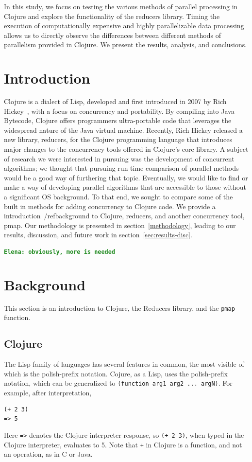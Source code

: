 \documentclass[12pt]{article}
\newcommand{\comment}[1]{{\bf \tt  {#1}}}
\newcommand{\emcomment}[1]{\textcolor{ForestGreen}{\comment{Elena: {#1}}}}
\newcommand{\clocode}[1]{{\texttt {#1}}}
\begin{document}
In this study, we focus on testing the various methods of parallel processing in Clojure and explore the functionality of the reducers library. Timing the execution of computationally expensive and highly parallelizable data processing allows us to directly observe the differences between different methods of parallelism provided in Clojure. We present the results, analysis, and conclusions.


 \newpage

\setcounter{page}{1}


\section{Introduction}\label{sec:intro}

	 Clojure is a dialect of Lisp, developed and first introduced in 2007 by Rich Hickey~\cite{Hickey:2008}, with a focus on concurrency and portability. By compiling into Java Bytecode, Clojure offers programmers ultra-portable code that leverages the widespread nature of the Java virtual machine. Recently, Rich Hickey released a new library, reducers, for the Clojure programming language that introduces major changes to the concurrency tools offered in Clojure's core library. A subject of research we were interested in pursuing was the development of concurrent algorithms; we thought that pursuing run-time comparison of parallel methods would be a good way of furthering that topic. Eventually, we would like to find or make a way of developing parallel algorithms that are accessible to those without a significant OS background. To that end, we sought to compare some of the built in methods for adding concurrency to Clojure code. We provide a introduction~/ref{background} to Clojure, reducers, and another concurrency tool, pmap. Our methodology is presented in section~\ref{methodology}, leading to our results, discussion, and future work in section~\ref{sec:results-disc}.

\emcomment{obviously, more is needed}

\section{Background}\label{sec:background}
This section is an introduction to Clojure, the Reducers library, and the \clocode{pmap} function. 
\subsection{Clojure}\label{sec:clojure}
The Lisp family of languages has several features in common, the most visible of which is the polish-prefix notation. Cojure, as a Lisp, uses the polish-prefix notation, which can be generalized to \clocode{(function arg1 arg2 ... argN)}. For example, after interpretation, 
\begin{verbatim}
(+ 2 3)
=> 5
\end{verbatim}
Here \clocode{=>} denotes the Clojure interpreter response, so \clocode{(+ 2 3)}, when typed in the Clojure interpreter, evaluates to 5. 
Note that \clocode{+} in Clojure is a function, and not an operation, as in C or Java. 
\end{document}
